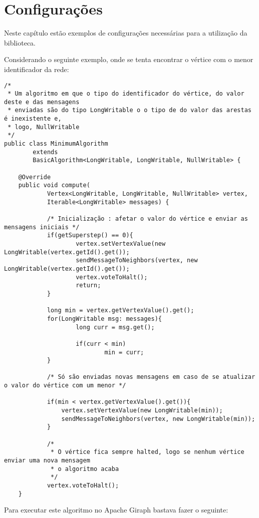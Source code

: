 \chapter{Configurações}
Neste capítulo estão exemplos de configurações necessárias para a utilização da biblioteca.
\linebreak

Considerando o seguinte exemplo, onde se tenta encontrar o vértice com o menor identificador da rede:%
\begin{verbatim}
/* 
 * Um algoritmo em que o tipo do identificador do vértice, do valor deste e das mensagens
 * enviadas são do tipo LongWritable o o tipo de do valor das arestas é inexistente e,
 * logo, NullWritable 
 */
public class MinimumAlgorithm
		extends
		BasicAlgorithm<LongWritable, LongWritable, NullWritable> {
	
	@Override
	public void compute(
			Vertex<LongWritable, LongWritable, NullWritable> vertex,
			Iterable<LongWritable> messages) {
			
			/* Inicialização : afetar o valor do vértice e enviar as mensagens iniciais */
			if(getSuperstep() == 0){
					vertex.setVertexValue(new LongWritable(vertex.getId().get());
					sendMessageToNeighbors(vertex, new LongWritable(vertex.getId().get());
					vertex.voteToHalt();
					return;
			}
			
			long min = vertex.getVertexValue().get();
			for(LongWritable msg: messages){
					long curr = msg.get();
					
					if(curr < min)
							min = curr;
			}
			
			/* Só são enviadas novas mensagens em caso de se atualizar o valor do vértice com um menor */
			
			if(min < vertex.getVertexValue().get()){
				vertex.setVertexValue(new LongWritable(min));
				sendMessageToNeighbors(vertex, new LongWritable(min));
			}
			
			/*
			 * O vértice fica sempre halted, logo se nenhum vértice enviar uma nova mensagem 
			 * o algoritmo acaba 
			 */
			vertex.voteToHalt();
	}
	\end{verbatim}
	
	Para executar este algoritmo no Apache Giraph bastava fazer o seguinte:
	
